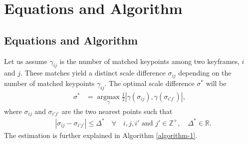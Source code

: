 \chapter{Equations and Algorithm}
\label{sec-figures}

\section{Equations and Algorithm}
Let us assume $\gamma_{ij}$ is the number of matched keypoints among two keyframes, $i$ and $j$. These matches yield a distinct scale difference $\sigma_{ij} $ depending on the number of matched keypoints $\gamma_{ij}$. The optimal scale difference $\sigma^*$ will be
\begin{equation}
	\begin{aligned}
		\sigma^* &= \operatorname*{argmax}_{\gamma} \frac{1}{2}|\gamma(\sigma_{ij}), \gamma(\sigma_{i'j'}) | ,
	\end{aligned}
	\label{eqa-1}
\end{equation} 
where $\sigma_{ij} $ and $\sigma_{i'j'}$ are the two nearest points such that\\
\begin{equation}
	\begin{split}
		\quad |\sigma_{ij} - \sigma_{i'j'}| \leq \Delta^* \quad \forall \quad i, j, i' \text{ and } j' \in \mathds{Z}^+, \quad \Delta^* \in \mathbb{R}.
	\end{split}
	\label{eqa-1}
\end{equation} 
The estimation is further explained in Algorithm \ref{algorithm-1}.\\

